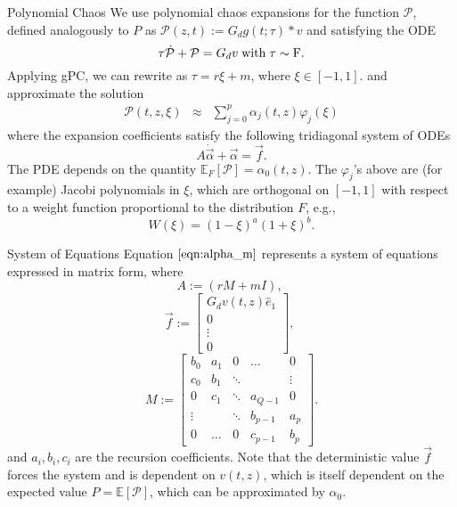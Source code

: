 \documentclass[final]{beamer} %
\renewcommand{\phi}{\varphi}
\newcommand{\field}[1]{\mathbb{#1}} %
\newcommand{\script}[1]{\mathcal{#1}} %
\begin{document}
\begin{frame}[t]
\begin{columns}[t]
\begin{column}{0.28\paperwidth}
\begin{block}{Polynomial Chaos}
We use polynomial chaos expansions for the function $\script{P}$, defined analogously
to $P$ as $\script{P} (z, t) := G_d g(t; \tau) * v$ and satisfying the ODE
\begin{equation}
\tau \dot{\script{P}} + \script{P} = G_d v \;\rm{with}\; \tau \sim F.
\end{equation}
Applying gPC, we can rewrite as $\tau = r\xi+m$, where $\xi \in [-1,1]$.
and approximate the solution 
\begin{eqnarray}
\script{P}(t,z,\xi) & \approx & \sum_{j=0}^{p} \alpha_j (t,z) \phi_j(\xi)
\label{eqn2}
\end{eqnarray}
where the expansion coefficients satisfy the following tridiagonal
system of ODEs
\begin{equation} \label{eqn:alpha_m}
A \dot{\vec{\alpha}} + \vec{\alpha} = \vec{f}.
\end{equation} 
The PDE depends on the quantity $\field{E}_F \left[\script{P}\right] = \alpha_0 (t,z)$.
The $\phi_j$'s above are (for example) Jacobi polynomials in $\xi$,
which are orthogonal on $[-1,1]$ with respect to a weight function
proportional to the distribution $F$, e.g.,
\[W(\xi) = (1-\xi)^a (1+\xi)^b.\]
\end{block}

\begin{block}{System of Equations }
Equation $\ref{eqn:alpha_m}$ represents a system of equations expressed in matrix form,
where
\[
A := (rM + mI),\;
\]
\[
\vec{f} := \left[\begin{array}{c}
G_d v(t,z) \hat{e}_1\\
0\\
\vdots\\
0
\end{array}\right],\;
\]
\[
M := \left[\begin{array}{ccccc}
b_0 & a_1 & 0 & \dots & 0 \\
c_0 & b_1 & \ddots &  & \vdots \\
0 & c_1 & \ddots & a_{Q-1} & 0 \\
\vdots &  & \ddots & b_{p-1} & a_p \\
0 & \dots & 0 & c_{p-1} & b_p
\end{array}\right].
\]
and $a_i, b_i, c_i$ are the recursion coefficients. Note that the deterministic
value $\vec{f}$ forces the system and is dependent on $v(t,z)$, which is itself
dependent on the expected value $P = \field{E}\left[\script{P}\right]$, which can
be approximated by $\alpha_0$.
\end{block}


\end{column}
\end{columns}
\end{frame}
\end{document}
